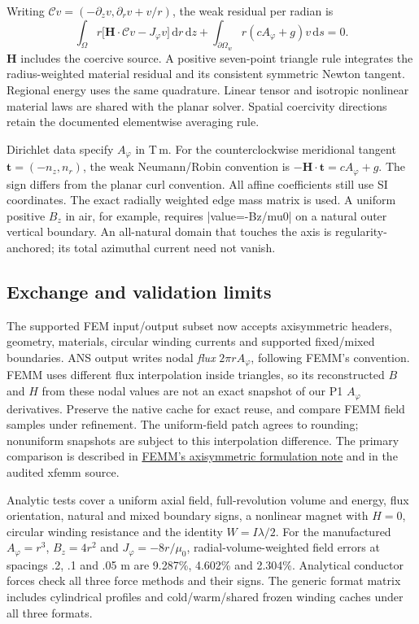 Writing $\mathcal C v=(-\partial_zv,\partial_rv+v/r)$, the weak residual per
radian is
\[
 \int_\Omega r\bigl[\mathbf H\cdot\mathcal Cv-J_\varphi v\bigr]
       \,\mathrm dr\,\mathrm dz
 +\int_{\partial\Omega_w}r(cA_\varphi+g)v\,\mathrm ds=0.
\]
$\mathbf H$ includes the coercive source. A positive seven-point triangle rule
integrates the radius-weighted material residual and its consistent symmetric
Newton tangent. Regional energy uses the same quadrature. Linear tensor and
isotropic nonlinear material laws are shared with the planar solver. Spatial
coercivity directions retain the documented elementwise averaging rule.

Dirichlet data specify $A_\varphi$ in T\,m. For the counterclockwise meridional
tangent $\mathbf t=(-n_z,n_r)$, the weak Neumann/Robin convention is
\emph{$-\mathbf H\cdot\mathbf t=cA_\varphi+g$}. The sign differs from the planar
curl convention. All affine coefficients still use SI coordinates. The exact
radially weighted edge mass matrix is used. A uniform positive $B_z$ in air,
for example, requires |value=-Bz/mu0| on a natural outer vertical boundary.
An all-natural domain that touches the axis is regularity-anchored; its total
azimuthal current need not vanish.

\subsection{Exchange and validation limits}
The supported FEM input/output subset now accepts axisymmetric headers, geometry,
materials, circular winding currents and supported fixed/mixed boundaries.
ANS output writes nodal \emph{flux} $2\pi rA_\varphi$, following FEMM's convention.
FEMM uses different flux interpolation inside triangles, so its reconstructed
$B$ and $H$ from these nodal values are not an exact snapshot of our P1
$A_\varphi$ derivatives. Preserve the native cache for exact reuse, and compare
FEMM field samples under refinement. The uniform-field patch agrees to rounding;
nonuniform snapshots are subject to this interpolation difference.
The primary comparison is described in
\href{https://femm.info/doku/doku.php?id=axisymmetricformulation}{FEMM's
axisymmetric formulation note} and in the audited xfemm source.

Analytic tests cover a uniform axial field, full-revolution volume and energy,
flux orientation, natural and mixed boundary signs, a nonlinear magnet with
$H=0$, circular winding resistance and the identity $W=I\lambda/2$.
For the manufactured $A_\varphi=r^3$, $B_z=4r^2$ and
$J_\varphi=-8r/\mu_0$, radial-volume-weighted field errors at spacings
.2, .1 and .05 m are 9.287\%, 4.602\% and 2.304\%.
Analytical conductor forces check all three force methods and their signs.
The generic format matrix includes cylindrical profiles and cold/warm/shared
frozen winding caches under all three formats.

